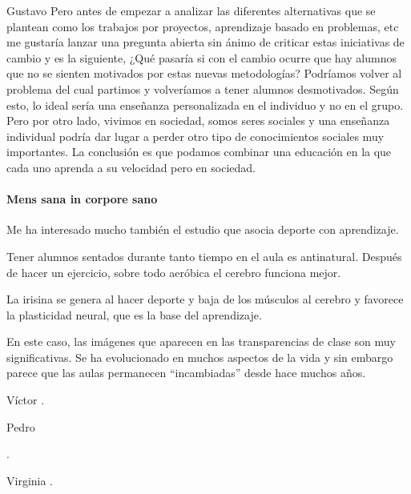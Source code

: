 \begin{opin}{\guscolor}{Gustavo}
Pero antes de empezar a analizar las diferentes alternativas que se plantean como los trabajos por proyectos, aprendizaje basado en problemas, etc me gustaría lanzar una pregunta abierta sin ánimo de criticar estas iniciativas de cambio y es la siguiente, ¿Qué pasaría si con el cambio ocurre que hay alumnos que no se sienten motivados por estas nuevas metodologías? Podríamos volver al problema del cual partimos y volveríamos a tener alumnos desmotivados. Según esto, lo ideal sería una enseñanza personalizada en el individuo y no en el grupo. Pero por otro lado, vivimos en sociedad, somos seres sociales y una enseñanza individual podría dar lugar a perder otro tipo de conocimientos sociales muy importantes. La conclusión es que podamos combinar una educación en la que cada uno aprenda a su velocidad pero en sociedad.

\paragraph{Mens sana in corpore sano}
Me ha interesado mucho también el estudio que asocia deporte con aprendizaje.


Tener alumnos sentados durante tanto tiempo en el aula es antinatural. Después de hacer un ejercicio, sobre todo aeróbica el cerebro funciona mejor.


La irisina se genera al hacer deporte y baja de los músculos al cerebro y favorece la plasticidad neural, que es la base del aprendizaje.


En este caso, las imágenes que aparecen en las transparencias de clase son muy significativas. Se ha evolucionado en muchos aspectos de la vida y sin embargo parece que las aulas permanecen “incambiadas” desde hace muchos años.
\end{opin}


\begin{opin}{\victorcolor}{Víctor}
.


\end{opin}

\begin{opin}{\pedrocolor}{Pedro}

.


\end{opin}

\begin{opin}{\virgicolor}{Virginia}
.


\end{opin}
